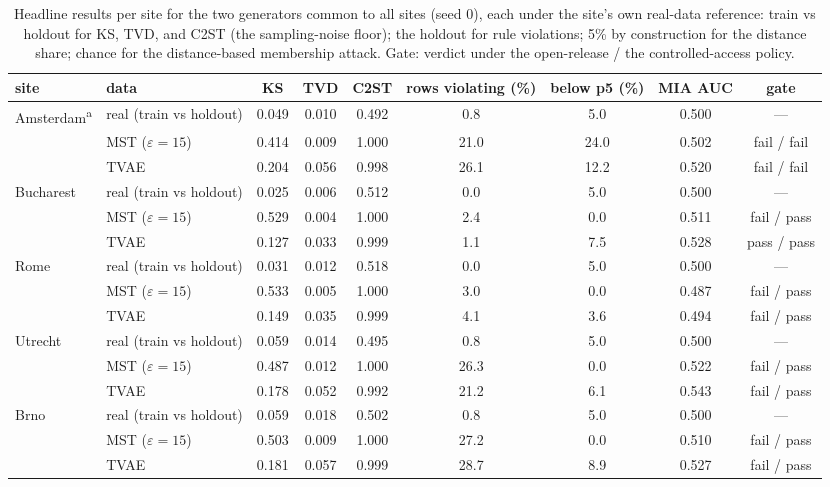 \documentclass[11pt,a4paper]{article}
\newcommand{\eps}{\ensuremath{\varepsilon}}
\begin{document}
\begin{table}[htbp]
\centering
\footnotesize
\setlength{\tabcolsep}{3.5pt}
\caption{Headline results per site for the two generators common to all sites
(seed 0), each under the site's own real-data reference: train vs holdout for KS,
TVD, and C2ST (the sampling-noise floor); the holdout for rule violations; 5\% by
construction for the distance share; chance for the distance-based membership
attack. Gate: verdict under the open-release / the controlled-access policy.}
\label{tab:sitesheadline}
\begin{tabular}{llccccccc}
\toprule
site & data & KS & TVD & C2ST & rows violating (\%) & below p5 (\%) & MIA AUC & gate \\
\midrule
Amsterdam\textsuperscript{a} & real (train vs holdout) & 0.049 & 0.010 & 0.492 & 0.8 & 5.0 & 0.500 & --- \\
 & MST ($\eps{=}15$) & 0.414 & 0.009 & 1.000 & 21.0 & 24.0 & 0.502 & fail / fail \\
 & TVAE & 0.204 & 0.056 & 0.998 & 26.1 & 12.2 & 0.520 & fail / fail \\
\addlinespace
Bucharest & real (train vs holdout) & 0.025 & 0.006 & 0.512 & 0.0 & 5.0 & 0.500 & --- \\
 & MST ($\eps{=}15$) & 0.529 & 0.004 & 1.000 & 2.4 & 0.0 & 0.511 & fail / pass \\
 & TVAE & 0.127 & 0.033 & 0.999 & 1.1 & 7.5 & 0.528 & pass / pass \\
\addlinespace
Rome & real (train vs holdout) & 0.031 & 0.012 & 0.518 & 0.0 & 5.0 & 0.500 & --- \\
 & MST ($\eps{=}15$) & 0.533 & 0.005 & 1.000 & 3.0 & 0.0 & 0.487 & fail / pass \\
 & TVAE & 0.149 & 0.035 & 0.999 & 4.1 & 3.6 & 0.494 & fail / pass \\
\addlinespace
Utrecht & real (train vs holdout) & 0.059 & 0.014 & 0.495 & 0.8 & 5.0 & 0.500 & --- \\
 & MST ($\eps{=}15$) & 0.487 & 0.012 & 1.000 & 26.3 & 0.0 & 0.522 & fail / pass \\
 & TVAE & 0.178 & 0.052 & 0.992 & 21.2 & 6.1 & 0.543 & fail / pass \\
\addlinespace
Brno & real (train vs holdout) & 0.059 & 0.018 & 0.502 & 0.8 & 5.0 & 0.500 & --- \\
 & MST ($\eps{=}15$) & 0.503 & 0.009 & 1.000 & 27.2 & 0.0 & 0.510 & fail / pass \\
 & TVAE & 0.181 & 0.057 & 0.999 & 28.7 & 8.9 & 0.527 & fail / pass \\

\end{tabular}
\end{table}
\end{document}
